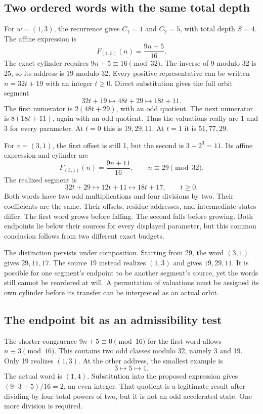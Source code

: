 \subsection{Two ordered words with the same total depth}\label{sec:orderedexamples}
For $w=(1,3)$, the recurrence gives $C_1=1$ and $C_2=5$, with total depth $S=4$. The affine expression is
\[
F_{(1,3)}(n)=\frac{9n+5}{16}.
\]
The exact cylinder requires $9n+5\equiv16\pmod{32}$. The inverse of 9 modulo 32 is 25, so its address is $19$ modulo 32. Every positive representative can be written $n=32t+19$ with an integer $t\ge0$. Direct substitution gives the full orbit segment
\begin{equation}\label{eq:word13}
32t+19\longmapsto48t+29\longmapsto18t+11.
\end{equation}
The first numerator is $2(48t+29)$, with an odd quotient. The next numerator is $8(18t+11)$, again with an odd quotient. Thus the valuations really are 1 and 3 for every parameter. At $t=0$ this is $19,29,11$. At $t=1$ it is $51,77,29$.

For $v=(3,1)$, the first offset is still 1, but the second is $3+2^3=11$. Its affine expression and cylinder are
\[
F_{(3,1)}(n)=\frac{9n+11}{16},\qquad n\equiv29\pmod{32}.
\]
The realized segment is
\begin{equation}\label{eq:word31}
32t+29\longmapsto12t+11\longmapsto18t+17,
\qquad t\ge0.
\end{equation}
Both words have two odd multiplications and four divisions by two. Their coefficients are the same. Their offsets, residue addresses, and intermediate states differ. The first word grows before falling. The second falls before growing. Both endpoints lie below their sources for every displayed parameter, but this common conclusion follows from two different exact budgets.

The distinction persists under composition. Starting from 29, the word $(3,1)$ gives $29,11,17$. The source 19 instead realizes $(1,3)$ and gives $19,29,11$. It is possible for one segment's endpoint to be another segment's source, yet the words still cannot be reordered at will. A permutation of valuations must be assigned its own cylinder before its transfer can be interpreted as an actual orbit.

\subsection{The endpoint bit as an admissibility test}
The shorter congruence $9n+5\equiv0\pmod{16}$ for the first word allows $n\equiv3\pmod{16}$. This contains two odd classes modulo 32, namely 3 and 19. Only 19 realizes $(1,3)$. At the other address, the smallest example is
\[
3\longmapsto5\longmapsto1.
\]
The actual word is $(1,4)$. Substitution into the proposed expression gives $(9\cdot3+5)/16=2$, an even integer. That quotient is a legitimate result after dividing by four total powers of two, but it is not an odd accelerated state. One more division is required.

